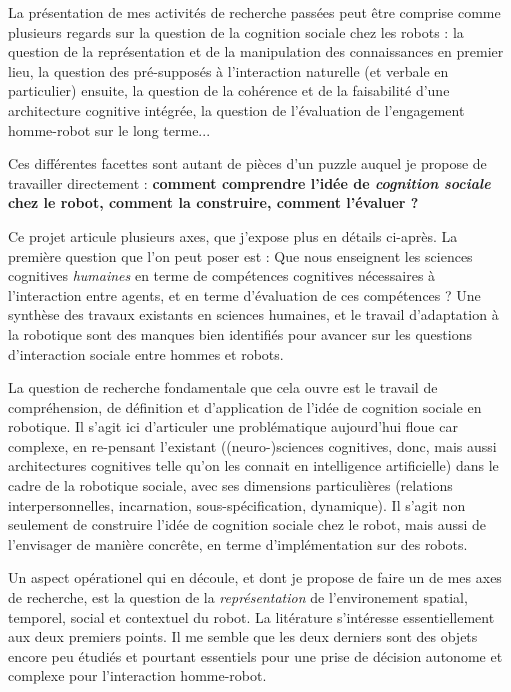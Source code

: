 \documentclass[a4paper]{article}
\begin{document}
La présentation de mes activités de recherche passées peut être comprise comme
plusieurs regards sur la question de la cognition sociale chez les robots : la
question de la représentation et de la manipulation des connaissances en premier
lieu, la question des pré-supposés à l'interaction naturelle (et verbale en
particulier) ensuite, la question de la cohérence et de la faisabilité d'une
architecture cognitive intégrée, la question de l'évaluation de l'engagement
homme-robot sur le long terme...

Ces différentes facettes sont autant de pièces d'un puzzle auquel je propose de
travailler directement : \textbf{comment comprendre l'idée de \emph{cognition
sociale} chez le robot, comment la construire, comment l'évaluer ?}

Ce projet articule plusieurs axes, que j'expose plus en détails ci-après. La
première question que l'on peut poser est : Que nous enseignent les sciences
cognitives \emph{humaines} en terme de compétences cognitives nécessaires à
l'interaction entre agents, et en terme d'évaluation de ces compétences ? Une
synthèse des travaux existants en sciences humaines, et le travail d'adaptation
à la robotique sont des manques bien identifiés pour avancer sur les questions
d'interaction sociale entre hommes et robots.

La question de recherche fondamentale que cela ouvre est le travail de
compréhension, de définition et d'application de l'idée de cognition sociale en
robotique. Il s'agit ici d'articuler une problématique aujourd'hui floue car
complexe, en re-pensant l'existant ((neuro-)sciences cognitives, donc, mais
aussi architectures cognitives telle qu'on les connait en intelligence
artificielle) dans le cadre de la robotique sociale, avec ses dimensions
particulières (relations interpersonnelles, incarnation, sous-spécification,
dynamique). Il s'agit non seulement de construire l'idée de cognition sociale
chez le robot, mais aussi de l'envisager de manière concrête, en terme
d'implémentation sur des robots.

Un aspect opérationel qui en découle, et dont je propose de faire un de mes axes
de recherche, est la question de la \emph{représentation} de l'environement
spatial, temporel, social et contextuel du robot. La litérature s'intéresse
essentiellement aux deux premiers points. Il me semble que les deux derniers
sont des objets encore peu étudiés et pourtant essentiels pour une prise de
décision autonome et complexe pour l'interaction homme-robot.
\end{document}
